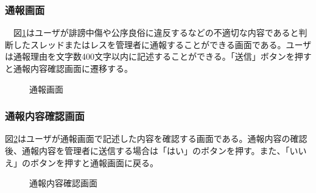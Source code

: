 \documentclass[a4j]{jarticle}
\begin{document}
\subsubsection{通報画面}
　図\ref{fig:report_reason}はユーザが誹謗中傷や公序良俗に違反するなどの不適切な内容であると判断したスレッドまたはレスを管理者に通報することができる画面である。ユーザは通報理由を文字数400文字以内に記述することができる。「送信」ボタンを押すと通報内容確認画面に遷移する。
\begin{figure}[H]
\begin{center}
\caption{通報画面}
\label{fig:report_reason}
\end{center}
\end{figure}

\subsubsection{通報内容確認画面}
図\ref{fig:report_confirm}はユーザが通報画面で記述した内容を確認する画面である。通報内容の確認後、通報内容を管理者に送信する場合は「はい」のボタンを押す。また、「いいえ」のボタンを押すと通報画面に戻る。
\begin{figure}[H]
\begin{center}
\caption{通報内容確認画面}
\label{fig:report_confirm}
\end{center}
\end{figure}
\end{document}
